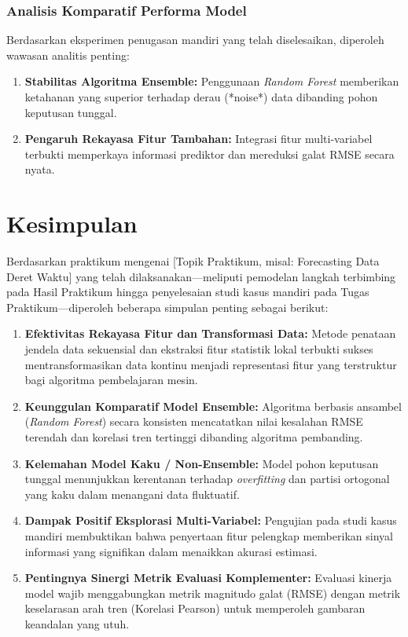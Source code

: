 \documentclass[a4paper,oneside,11pt]{book}
\begin{document}
\subsection{Analisis Komparatif Performa Model}
Berdasarkan eksperimen penugasan mandiri yang telah diselesaikan, diperoleh wawasan analitis penting:
\begin{enumerate}
    \item \textbf{Stabilitas Algoritma Ensemble:} Penggunaan \textit{Random Forest} memberikan ketahanan yang superior terhadap derau (*noise*) data dibanding pohon keputusan tunggal.
    \item \textbf{Pengaruh Rekayasa Fitur Tambahan:} Integrasi fitur multi-variabel terbukti memperkaya informasi prediktor dan mereduksi galat RMSE secara nyata.
\end{enumerate}

\chapter{Kesimpulan}
\label{chap:kesimpulan}

Berdasarkan praktikum mengenai [Topik Praktikum, misal: Forecasting Data Deret Waktu] yang telah dilaksanakan—meliputi pemodelan langkah terbimbing pada Hasil Praktikum hingga penyelesaian studi kasus mandiri pada Tugas Praktikum—diperoleh beberapa simpulan penting sebagai berikut:

\begin{enumerate}
    \item \textbf{Efektivitas Rekayasa Fitur dan Transformasi Data:} Metode penataan jendela data sekuensial dan ekstraksi fitur statistik lokal terbukti sukses mentransformasikan data kontinu menjadi representasi fitur yang terstruktur bagi algoritma pembelajaran mesin.
    
    \item \textbf{Keunggulan Komparatif Model Ensemble:} Algoritma berbasis ansambel (\textit{Random Forest}) secara konsisten mencatatkan nilai kesalahan RMSE terendah dan korelasi tren tertinggi dibanding algoritma pembanding.
    
    \item \textbf{Kelemahan Model Kaku / Non-Ensemble:} Model pohon keputusan tunggal menunjukkan kerentanan terhadap \textit{overfitting} dan partisi ortogonal yang kaku dalam menangani data fluktuatif.
    
    \item \textbf{Dampak Positif Eksplorasi Multi-Variabel:} Pengujian pada studi kasus mandiri membuktikan bahwa penyertaan fitur pelengkap memberikan sinyal informasi yang signifikan dalam menaikkan akurasi estimasi.
    
    \item \textbf{Pentingnya Sinergi Metrik Evaluasi Komplementer:} Evaluasi kinerja model wajib menggabungkan metrik magnitudo galat (RMSE) dengan metrik keselarasan arah tren (Korelasi Pearson) untuk memperoleh gambaran keandalan yang utuh.
\end{enumerate}
\end{document}
